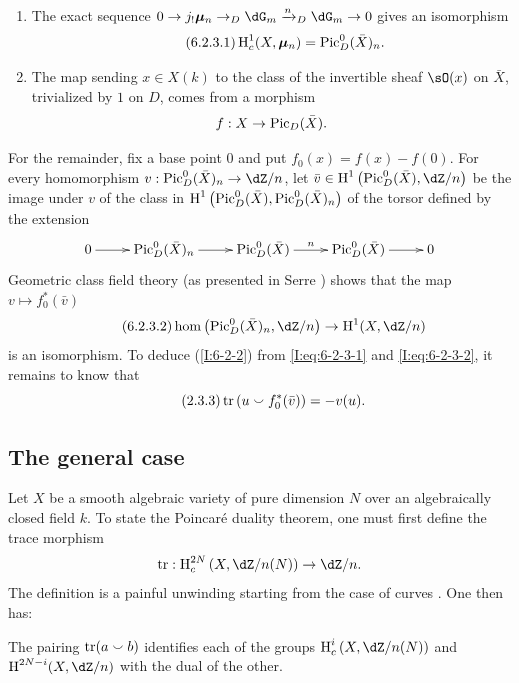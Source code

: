 \begin{enumerate}[\indent a)]
  \item The exact sequence
    $0\to j_!\dmu_n\to_D\dG_m\xrightarrow{n}_D\dG_m\to0$ gives an
    isomorphism
    \begin{equation*}\tag{6.2.3.1}\label{I:eq:6-2-3-1}
      \operatorname{H}_c^1(X,{\bm\mu}_n) = \operatorname{Pic}_D^0(\bar X)_n \text{.}
    \end{equation*}
  \item The map sending $x\in X(k)$ to the class of the invertible sheaf
    $\sO(x)$ on $\bar X$, trivialized by $1$ on $D$, comes from a
    morphism
    \[
      f:X \to \operatorname{Pic}_D(\bar X) \text{.}
    \]
\end{enumerate}
For the remainder, fix a base point $0$ and put
$f_0(x)=f(x)-f(0)$. For every homomorphism
$v:\pic_D^0(\bar X)_n\to\dZ/n$, let
$\bar v\in\h^1\left(\pic_D^0(\bar X),\dZ/n\right)$ be the image under
$v$ of the class in
$\operatorname{H}^1\left(\operatorname{Pic}_D^0(\bar X),\operatorname{Pic}_D^0(\bar X)_n\right)$ of the torsor
defined by the extension
\[\xymatrix{
  0 \ar[r]
    & \pic_D^0(\bar X)_n \ar[r]
    & \pic_D^0(\bar X) \ar[r]^-n
    & \pic_D^0(\bar X) \ar[r]
    & 0
}\]
Geometric class field theory (as presented in Serre \cite{se59}) shows
that the map $v\mapsto f_0^*(\bar v)$
\begin{equation*}\tag{6.2.3.2}\label{I:eq:6-2-3-2}
  \hom\left(\pic_D^0(\bar X)_n,\dZ/n\right) \to \h^1(X,\dZ/n)
\end{equation*}
is an isomorphism. To deduce (\ref{I:6-2-2}) from
\eqref{I:eq:6-2-3-1} and \eqref{I:eq:6-2-3-2}, it remains to know that
\begin{equation*}\tag{2.3.3}\label{I:eq:6-2-3-3}
  \operatorname{tr}\left(u \smallsmile f_0^*(\bar v)\right) = -v(u) \text{.}
\end{equation*}


\subsection{The general case}\label{I:6-3}

Let $X$ be a smooth algebraic variety of pure dimension $N$ over an
algebraically closed field $k$. To state the Poincaré duality theorem,
one must first define the trace morphism
\[
  \tr : \h_c^{2N}\left(X,\dZ/n(N)\right) \to \dZ/n\text{.}
\]
The definition is a painful unwinding starting from the case of curves
\cite[XVIII \S 2]{sga4}. One then has:

\begin{theorem}\label{I:6-3-1}
The pairing $\operatorname{tr}(a\smallsmile b)$ identifies each of the groups
$\h_c^i\left(X,\dZ/n(N)\right)$ and $\h^{2N-i}(X,\dZ/n)$ with the dual
of the other.
\end{theorem}

